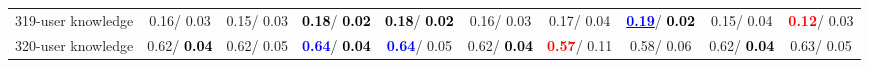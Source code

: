 \begin{table}[h]
\begin{center}
{\begin{tabular}{lc|c|c|c|c|c|c|c|c}
319-user knowledge &   0.16/  0.03 &   0.15/  0.03 & \textcolor{black}{\textbf{  0.18}}/\textcolor{black}{\textbf{  0.02}} & \textcolor{black}{\textbf{  0.18}}/\textcolor{black}{\textbf{  0.02}} &   0.16/  0.03 &   0.17/  0.04 & \underline{\textcolor{blue}{\textbf{  0.19}}}/\textcolor{black}{\textbf{  0.02}} &   0.15/  0.04 & \textcolor{red}{\textbf{  0.12}}/  0.03 \\
320-user knowledge &   0.62/\textcolor{black}{\textbf{  0.04}} &   0.62/  0.05 & \textcolor{blue}{\textbf{  0.64}}/\textcolor{black}{\textbf{  0.04}} & \textcolor{blue}{\textbf{  0.64}}/  0.05 &   0.62/\textcolor{black}{\textbf{  0.04}} & \textcolor{red}{\textbf{  0.57}}/  0.11 &   0.58/  0.06 &   0.62/\textcolor{black}{\textbf{  0.04}} &   0.63/  0.05 \\\end{tabular}}\label{stratsALCKappa9AllReduxhalfa}
\end{center}
\end{table}
